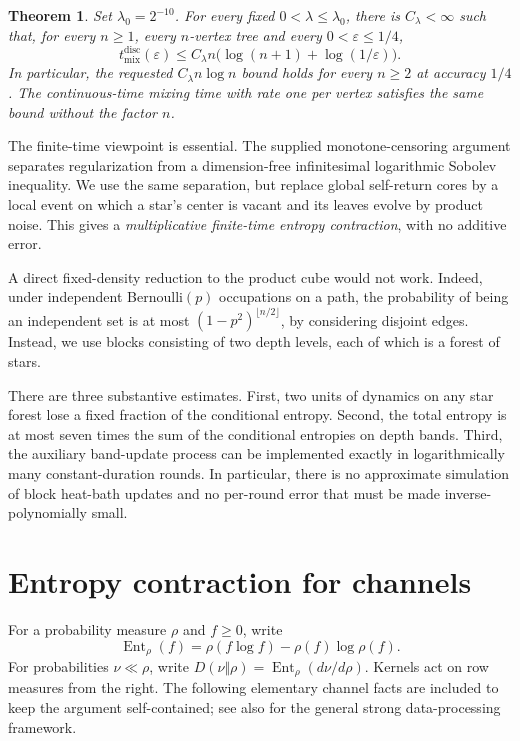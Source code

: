 \documentclass[11pt,reqno]{amsart}
\newtheorem{theorem}{Theorem}[section]
\theoremstyle{remark}
\DeclareMathOperator{\Ent}{Ent}
\numberwithin{equation}{section}
\begin{document}
\begin{theorem}\label{thm:main}
Set $\lambda_0=2^{-10}$. For every fixed $0<\lambda\le\lambda_0$, there is $C_\lambda<\infty$ such that, for every $n\ge1$, every $n$-vertex tree and every $0<\varepsilon\le1/4$,
\[
 t_{\mathrm{mix}}^{\mathrm{disc}}(\varepsilon)
 \le C_\lambda n\bigl(\log(n+1)+\log(1/\varepsilon)\bigr).
\]
In particular, the requested $C_\lambda n\log n$ bound holds for every $n\ge2$ at accuracy $1/4$. The continuous-time mixing time with rate one per vertex satisfies the same bound without the factor $n$.
\end{theorem}

The finite-time viewpoint is essential. The supplied monotone-censoring argument separates regularization from a dimension-free infinitesimal logarithmic Sobolev inequality. We use the same separation, but replace global self-return cores by a local event on which a star's center is vacant and its leaves evolve by product noise. This gives a \emph{multiplicative finite-time entropy contraction}, with no additive error.

A direct fixed-density reduction to the product cube would not work. Indeed, under independent Bernoulli$(p)$ occupations on a path, the probability of being an independent set is at most $(1-p^2)^{\lfloor n/2\rfloor}$, by considering disjoint edges. Instead, we use blocks consisting of two depth levels, each of which is a forest of stars.

There are three substantive estimates. First, two units of dynamics on any star forest lose a fixed fraction of the conditional entropy. Second, the total entropy is at most seven times the sum of the conditional entropies on depth bands. Third, the auxiliary band-update process can be implemented exactly in logarithmically many constant-duration rounds. In particular, there is no approximate simulation of block heat-bath updates and no per-round error that must be made inverse-polynomially small.

\section{Entropy contraction for channels}

For a probability measure $\rho$ and $f\ge0$, write
\[
 \Ent_\rho(f)=\rho(f\log f)-\rho(f)\log\rho(f).
\]
For probabilities $\nu\ll\rho$, write $D(\nu\Vert\rho)=\Ent_\rho(d\nu/d\rho)$. Kernels act on row measures from the right. The following elementary channel facts are included to keep the argument self-contained; see also \cite{Raginsky} for the general strong data-processing framework.
\end{document}
